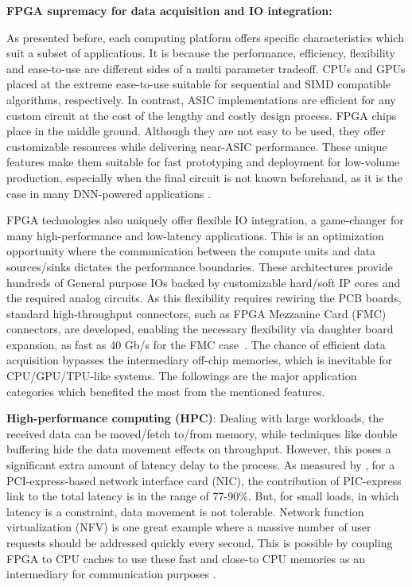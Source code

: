 \textbf{FPGA supremacy for data acquisition and IO integration:}

As presented before, each computing platform offers specific characteristics which suit a subset of applications. It is because the performance, efficiency, flexibility and ease-to-use are different sides of a multi parameter tradeoff. CPUs and GPUs placed at the extreme ease-to-use suitable for sequential and SIMD compatible algorithms, respectively. In contrast, ASIC implementations are efficient for any custom circuit at the cost of the lengthy and costly design process. FPGA chips place in the middle ground. Although they are not easy to be used, they offer customizable resources while delivering near-ASIC performance. These unique features make them suitable for fast prototyping and deployment for low-volume production, especially when the final circuit is not known beforehand, as it is the case in many DNN-powered applications \cite{10.1145/3411757.3411759}. 

FPGA technologies also uniquely offer flexible IO integration, a game-changer for many high-performance and low-latency applications. This is an optimization opportunity where the communication between the compute units and data sources/sinks dictates the performance boundaries. These architectures provide hundreds of General purpose IOs backed by customizable hard/soft IP cores and the required analog circuits. As this flexibility requires rewiring the PCB boards, standard high-throughput connectors, such as FPGA Mezzanine Card (FMC) connectors, are developed, enabling the necessary flexibility via daughter board expansion, as fast as 40 Gb/s for the FMC case~\cite{WP_Xilinx_FMC}. The chance of efficient data acquisition bypasses the intermediary off-chip memories, which is inevitable for CPU/GPU/TPU-like systems. The followings are the major application categories which benefited the most from the mentioned features.

{\bf High-performance computing (HPC)}: Dealing with large workloads, the received data can be moved/fetch to/from memory, while techniques like double buffering hide the data movement effects on throughput. However, this poses a significant extra amount of latency delay to the process. As measured by \cite{10.1145/3230543.3230560}, for a PCI-express-based network interface card (NIC), the contribution of PIC-express link to the total latency is in the range of 77-90\%. But, for small loads, in which latency is a constraint, data movement is not tolerable. Network function virtualization (NFV) is one great example where a massive number of user requests should be addressed quickly every second. This is possible by coupling FPGA to CPU caches to use these fast and close-to CPU memories as an intermediary for communication purposes \cite{10.1145/3411757.3411759}.

